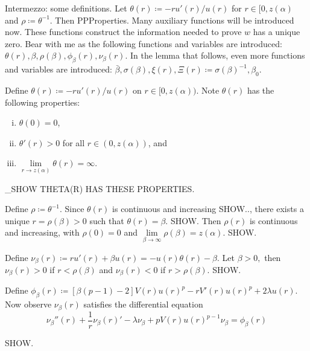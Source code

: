 
{\color{gray} Intermezzo: some definitions.
Let $\theta(r)\coloneqq-ru'(r)/u(r)$ for $r\in[0,z(\alpha)$ and $\rho\coloneqq\theta^{-1}$.
Then PPProperties.
Many auxiliary functions will be introduced now.
These functions construct the information needed to prove $w$ has a unique zero.
Bear with me as the following functions and variables are introduced:
$\theta(r),\beta,\rho(\beta),\phi_{\beta}(r),\nu_{\beta}(r)$.
In the lemma that follows, even more functions and variables are introduced:
$\bar\beta,\sigma(\beta),\xi(r), \Xi(r)\coloneqq\sigma(\beta)^{-1},\beta_0$.}

\seperate

{\color{teal}Define $\theta(r)\coloneqq-ru'(r)/u(r)$ on $r\in[0,z(\alpha))$.
Note $\theta(r)$ has the following properties:
\begin{enumerate}[(i)]
    \item $\theta(0)=0$,
    \item $\theta'(r)>0$ for all $r\in(0,z(\alpha))$, and
    \item $\underset{r\to z(\alpha)}{\lim}\theta(r)=\infty$.
\end{enumerate}
\_SHOW THETA(R) HAS THESE PROPERTIES.

\seperate

Define $\rho\coloneqq\theta^{-1}$.
Since $\theta(r)$ is continuous and increasing SHOW..,
there exists a unique $r=\rho(\beta)>0$ such that $\theta(r)=\beta$. SHOW.
Then $\rho(r)$ is continuous and increasing,
with $\rho(0)=0$ and $\underset{\beta\to\infty}{\lim}\rho(\beta)=z(\alpha).$ SHOW.

\seperate

Define $\nu_{\beta}(r)\coloneqq ru'(r)+\beta u(r)=-u(r){\theta(r)-\beta}.$
Let $\beta>0,$ then $\nu_{\beta}(r)>0$ if $r<\rho(\beta)$
and $\nu_{\beta}(r)<0$ if $r>\rho(\beta)$. SHOW.

Define $\phi_{\beta}(r)\coloneqq\left[\beta(p-1)-2\right]V(r)u(r)^p-rV'(r)u(r)^p+2\lambda u(r).$ Now observe $\nu_{\beta}(r)$ satisfies the differential equation $$\nu_{\beta}''(r)+\frac{1}{r}\nu_{\beta}(r)'-\lambda\nu_{\beta}+pV(r)u(r)^{p-1}\nu_{\beta}=\phi_{\beta}(r)$$} SHOW.

\seperate

